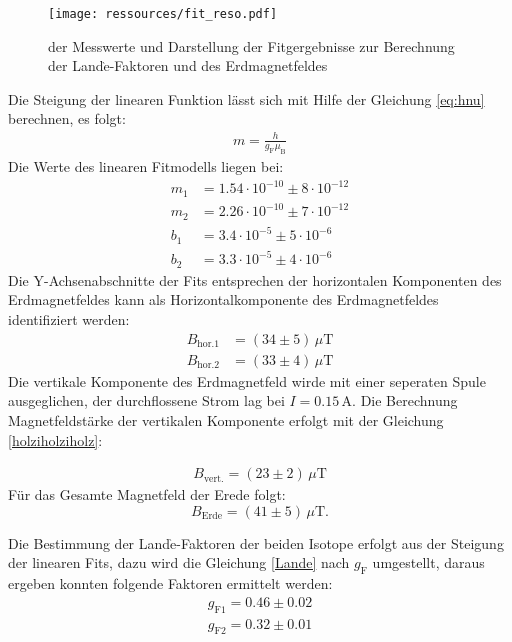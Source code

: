 \begin{figure}
\centering
\texttt{[image: ressources/fit\_reso.pdf]}
\caption{der Messwerte und Darstellung der Fitgergebnisse zur Berechnung
der Land$\grave{\text{e}}$-Faktoren und des Erdmagnetfeldes}
\label{plot1}
\end{figure}

Die Steigung der linearen Funktion lässt sich mit Hilfe der Gleichung \eqref{eq:hnu}
berechnen, es folgt:
\begin{align}
    \label{Lande}
    m=\frac{h}{g_\text{F}\mu_\text{B}}
\end{align}
Die Werte des linearen Fitmodells liegen bei:
\begin{align}
    \nonumber
    m_1&=1.54\cdot 10^{-10} \pm 8\cdot 10^{-12}\\
    \nonumber
    m_2&=2.26\cdot 10^{-10} \pm 7\cdot 10^{-12}\\
    \nonumber
    b_1&=3.4\cdot 10^{-5} \pm 5\cdot 10^{-6}\\
    \nonumber
    b_2&=3.3\cdot 10^{-5} \pm 4\cdot 10^{-6}
\end{align}
Die Y-Achsenabschnitte der Fits entsprechen der horizontalen Komponenten
des Erdmagnetfeldes kann als Horizontalkomponente des Erdmagnetfeldes
identifiziert werden:
\begin{align}
    \nonumber
    B_{\text{hor.}1}&=(34 \pm 5)\, \mu\text{T}\\
    \nonumber
    B_{\text{hor.}2}&=(33 \pm 4)\, \mu\text{T}
\end{align}
Die vertikale Komponente des Erdmagnetfeld wirde mit einer seperaten Spule
ausgeglichen, der durchflossene Strom lag bei $I=0.15\,\text{A}$. Die
Berechnung Magnetfeldstärke der vertikalen Komponente erfolgt mit der Gleichung
\eqref{holziholziholz}:

\begin{align}
    B_\text{vert.}=(23 \pm 2)\, \mu \text{T}
\end{align}
Für das Gesamte Magnetfeld der Erede folgt:
$$B_\text{Erde}=(41\pm 5 )\, \mu \text{T}.$$

Die Bestimmung der Land$\grave{\text{e}}$-Faktoren der beiden Isotope
erfolgt aus der Steigung der
linearen Fits, dazu wird die Gleichung \eqref{Lande} nach $g_\text{F}$
umgestellt, daraus ergeben konnten folgende Faktoren ermittelt werden:
\begin{align}
    g_{\text{F}1}=0.46 \pm 0.02 \\
    g_{\text{F}2}=0.32 \pm 0.01
\end{align}

